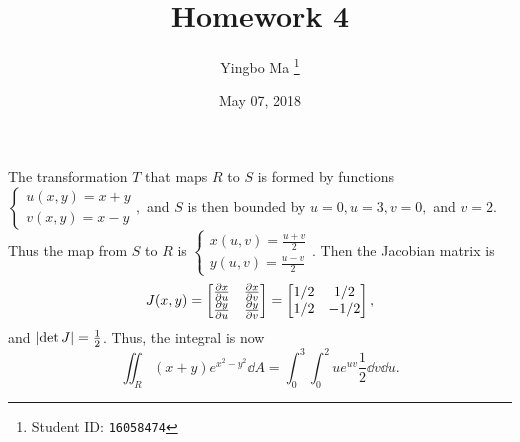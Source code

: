 \documentclass[8pt,twocolumn]{article}
\author{Yingbo Ma \thanks{Student ID: \tt{16058474}}}
\title{\vspace{-1.cm}Homework 4}
\date{May 07, 2018}
\begin{document}
\maketitle

\begin{Answer}[number=21]
  The transformation $T$ that maps $R$ to $S$ is formed by functions
  \(
    \begin{cases}
      u(x,y) = x+y \\
      v(x,y) = x-y
    \end{cases},
  \)
  and $S$ is then bounded by $u=0, u=3, v=0,$ and $v=2$. Thus the map from $S$
  to $R$ is
  \(
    \begin{cases}
      x(u,v) = \frac{u+v}{2} \\
      y(u,v) = \frac{u-v}{2}
    \end{cases}.
  \)
  Then the Jacobian matrix is
  \[
    J(x,y)={\begin{bmatrix}
      \pdv{x}{u}&\pdv{x}{v}\\
      \pdv{y}{u}&\pdv{y}{v}
    \end{bmatrix}}=
    \begin{bmatrix}1/2&1/2\\1/2&-1/2\end{bmatrix},
  \]
  and $\abs{\det J} = \frac{1}{2}$. Thus, the integral is now
      \[
    \iint_R (x+y)e^{x^2-y^2}\dd{A} = \int_0^3\int_0^2
    ue^{uv}\frac{1}{2}\dd{v}\dd{u}.
  \]
\end{Answer}
\end{document}
